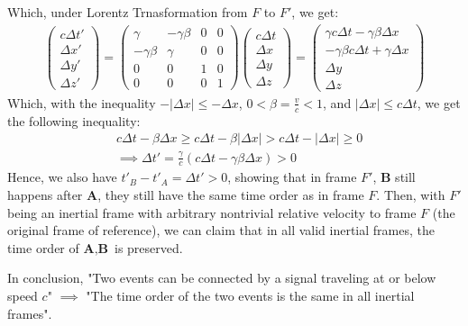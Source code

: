 \documentclass{article}
\newcommand{\bA}{\textbf{A}}
\newcommand{\bB}{\textbf{B}}
\begin{document}
\begin{itemize}
    Which, under Lorentz Trnasformation from $F$ to $F'$, we get:
    \begin{align}
        \begin{pmatrix}
            c\Delta t'\\ \Delta x'\\ \Delta y'\\ \Delta z'
        \end{pmatrix} = \begin{pmatrix}
            \gamma & -\gamma\beta & 0&0\\
            -\gamma\beta & \gamma &0&0\\
            0&0&1&0\\0&0&0&1
        \end{pmatrix}\begin{pmatrix}
            c\Delta t\\\Delta x\\\Delta y\\\Delta z
        \end{pmatrix} = \begin{pmatrix}
            \gamma c\Delta t-\gamma\beta \Delta x\\
            -\gamma\beta c\Delta t + \gamma \Delta x\\
            \Delta y\\
            \Delta z
        \end{pmatrix}
    \end{align}
    Which, with the inequality $-|\Delta x|\leq -\Delta x$, $0<\beta = \frac{v}{c}<1$, and $|\Delta x|\leq c\Delta t$, we get the following inequality:
    \begin{align}
        &c\Delta t - \beta \Delta x \geq c\Delta t - \beta |\Delta x| > c\Delta t - |\Delta x| \geq 0\\
        &\implies \Delta t' = \frac{\gamma}{c}(c\Delta t-\gamma\beta \Delta x) > 0
    \end{align}
    Hence, we also have $t'_B - t'_A = \Delta t' >0$, showing that in frame $F'$, $\bB$ still happens after $\bA$, they still have the same time order as in frame $F$. Then, with $F'$ being an inertial frame with arbitrary nontrivial relative velocity to frame $F$ (the original frame of reference), we can claim that in all valid inertial frames, the time order of $\bA,\bB$ is preserved.

    In conclusion, "Two events can be connected by a signal traveling at or below speed $c$" $\implies$ "The time order of the two events is the same in all inertial frames".
\end{itemize}
\end{document}
